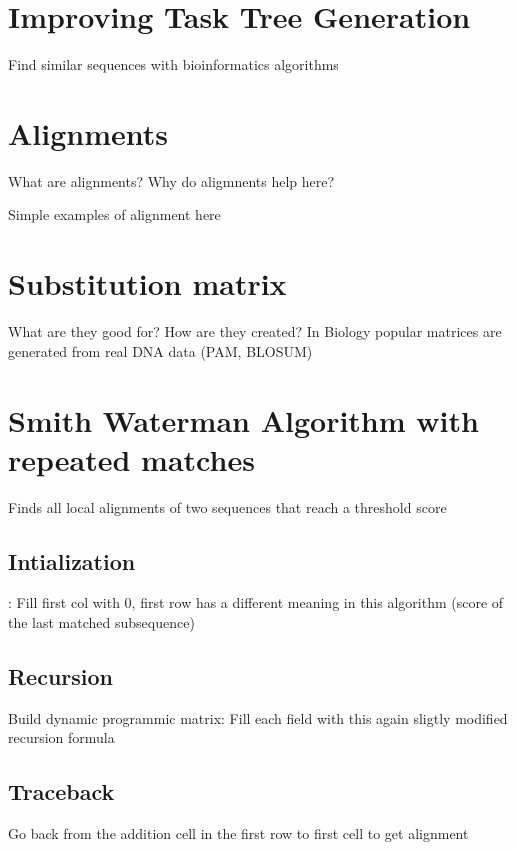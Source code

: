 \section{Improving Task Tree Generation}
Find similar sequences with bioinformatics algorithms

\section{Alignments}
What are alignments? Why do aligmnents help here?

Simple examples of alignment here

\section{Substitution matrix}
What are they good for? How are they created? In Biology popular matrices are generated from real DNA data (PAM, BLOSUM)

\section{Smith Waterman Algorithm with repeated matches}
Finds all local alignments of two sequences that reach a threshold score


\subsection{Intialization}:
Fill first col with 0, first row has a different meaning in this algorithm (score of the last matched subsequence)

\subsection{Recursion}
Build dynamic programmic matrix: Fill each field with this again sligtly modified recursion formula

\subsection{Traceback}
Go back from the addition cell in the first row to first cell to get alignment


